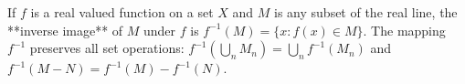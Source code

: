 If $f$ is a real valued function on a set $X$ and $M$ is any subset of the real line, the **inverse image** of $M$ under $f$ is $f^{-1}(M) = \{x : f(x) \in M\}$. The mapping $f^{-1}$ preserves all set operations: $f^{-1}(\bigcup_n M_n) = \bigcup_n f^{-1}(M_n)$ and $f^{-1}(M - N) = f^{-1}(M) - f^{-1}(N)$.
